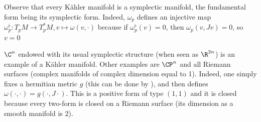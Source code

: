
Observe that every Kähler manifold is a symplectic manifold, the fundamental form being its symplectic form. Indeed, \(\omega_p\) defines an injective map \(\omega_p^\flat\colon T_pM \to T_p^*M, v \mapsto \omega(v, \cdot)\) because if \(\omega_p^\flat(v)=0\), then \(\omega_p(v,Jv)=0\), so \(v=0\)

\begin{example}
    \(\C^n\) endowed with its usual symplectic structure (when seen as \(\R^{2n}\)) is an example of a Kähler manifold. Other examples are \(\CP^n\) and all Riemann surfaces (complex manifolds of complex dimension equal to 1). Indeed, one simply fixes a hermitian metric \(g\) (this can be done by \parencite[Lemma 8.5]{lee_introCM}), and then defines \(\omega(\cdot, \cdot)=g(\cdot, J \cdot)\). This is a positive form of type \((1,1)\) \parencite[Prop. 8.9]{lee_introCM} and it is closed because every two-form is closed on a Riemann surface (its dimension as a smooth manifold is \(2\)).
\end{example}

